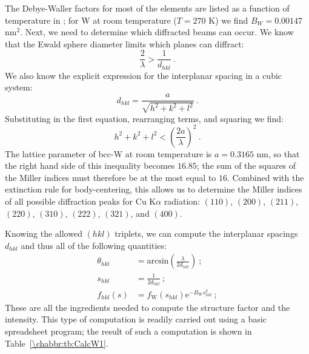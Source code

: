 \noindent The Debye-Waller factors for most of the elements are listed as a function of temperature in \cite{peng1996a}; for W at room temperature ($T =270$ K) we find $B_W=0.00147$ nm$^2$. Next, we need to determine which diffracted beams can occur.  We know that the Ewald sphere diameter limits which planes can diffract:
\[
	\frac{2}{\lambda} > \frac{1}{d_{hkl}}\ .
\]
We also know the explicit expression for the interplanar spacing in a cubic system:
\[
	d_{hkl} = \frac{a}{\sqrt{h^2+k^2+l^2}}\ .
\]
Substituting in the first equation, rearranging terms, and squaring we find:
\[
	h^2+k^2+l^2 < \left(\frac{2a}{\lambda}\right)^2\ .
\]
The lattice parameter of bcc-W at room temperature is $a=0.3165$ nm, so that the right hand side of this inequality becomes $16.85$; the sum of the squares of the Miller indices must therefore be at the most equal to $16$. Combined with the extinction rule for body-centering, this allows us to determine the Miller indices of all possible diffraction peaks for Cu K$\alpha$ radiation: $(110)$, $(200)$, $(211)$, $(220)$, $(310)$, $(222)$, $(321)$, and $(400)$.

Knowing the allowed $(hkl)$ triplets, we can compute the interplanar spacings $d_{hkl}$ and thus all of the following quantities:
\begin{equation*}
\begin{split}
	\theta_{hkl}&=\text{arcsin}\left(\frac{\lambda}{2d_{hkl}}\right)\ ;\\
	s_{hkl}&=\frac{1}{2d_{hkl}}\ ;\\ 
	f_{hkl}(s)&=f_\text{W}(s_{hkl})\mathrm{e}^{-B_{\text{W}}s_{hkl}^2}\ ;
\end{split}
\end{equation*}
These are all the ingredients needed to compute the structure factor and the intensity.  This type of computation is readily carried out using a basic spreadsheet program; the result of such a computation is shown in Table~\ref{\chabbr:tb:CalcW1}.



